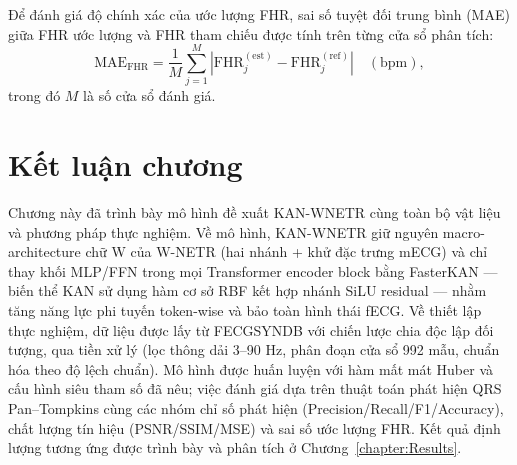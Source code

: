 \documentclass[../DoAn.tex]{subfiles}
\begin{document}
Để đánh giá độ chính xác của ước lượng FHR, sai số tuyệt đối trung bình (MAE) giữa FHR ước lượng và FHR tham chiếu được tính trên từng cửa sổ phân tích:
\begin{equation}
  \mathrm{MAE}_{\mathrm{FHR}} = \frac{1}{M}\sum_{j=1}^{M} \left| \mathrm{FHR}^{(\mathrm{est})}_j - \mathrm{FHR}^{(\mathrm{ref})}_j \right| \quad (\text{bpm}),
\end{equation}
trong đó $M$ là số cửa sổ đánh giá.

\section{Kết luận chương}

Chương này đã trình bày mô hình đề xuất KAN-WNETR cùng toàn bộ vật liệu và phương pháp thực nghiệm. Về mô hình, KAN-WNETR giữ nguyên macro-architecture chữ W của W-NETR (hai nhánh + khử đặc trưng mECG) và chỉ thay khối MLP/FFN trong mọi Transformer encoder block bằng FasterKAN --- biến thể KAN sử dụng hàm cơ sở RBF kết hợp nhánh SiLU residual --- nhằm tăng năng lực phi tuyến token-wise và bảo toàn hình thái fECG. Về thiết lập thực nghiệm, dữ liệu được lấy từ FECGSYNDB với chiến lược chia độc lập đối tượng, qua tiền xử lý (lọc thông dải 3--90 Hz, phân đoạn cửa sổ 992 mẫu, chuẩn hóa theo độ lệch chuẩn). Mô hình được huấn luyện với hàm mất mát Huber và cấu hình siêu tham số đã nêu; việc đánh giá dựa trên thuật toán phát hiện QRS Pan--Tompkins cùng các nhóm chỉ số phát hiện (Precision/Recall/F1/Accuracy), chất lượng tín hiệu (PSNR/SSIM/MSE) và sai số ước lượng FHR. Kết quả định lượng tương ứng được trình bày và phân tích ở Chương~\ref{chapter:Results}.
\end{document}
